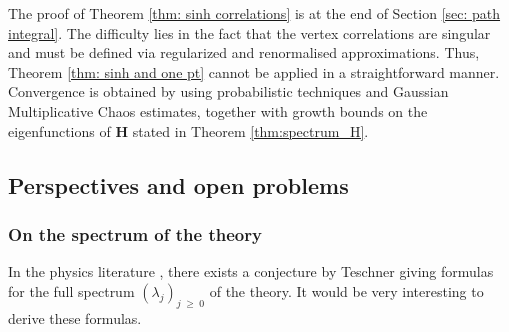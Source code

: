 \documentclass[11pt]{amsart}
\numberwithin{equation}{section}
\newcounter{conj}
\theoremstyle{definition}
\renewcommand{\geq}{\;\geqslant\;}                   %
\begin{document}
The proof of Theorem \ref{thm: sinh correlations} is at the end of Section \ref{sec: path integral}. The difficulty lies in the fact that the vertex correlations are singular and must be defined via regularized and renormalised approximations. Thus, Theorem \ref{thm: sinh and one pt} cannot be applied in a straightforward manner. Convergence is obtained by using probabilistic techniques and Gaussian Multiplicative Chaos estimates, together with growth bounds on the eigenfunctions of $\mathbf H$ stated in Theorem \ref{thm:spectrum_H}. 



\subsection{Perspectives and open problems}
\subsubsection{On the spectrum of the theory}
In the physics literature \cite{Tesch}, there exists a conjecture by Teschner giving formulas for the full spectrum $(\lambda_j)_{j \geq 0}$ of the theory. It would be very interesting to derive these formulas. 
\end{document}
